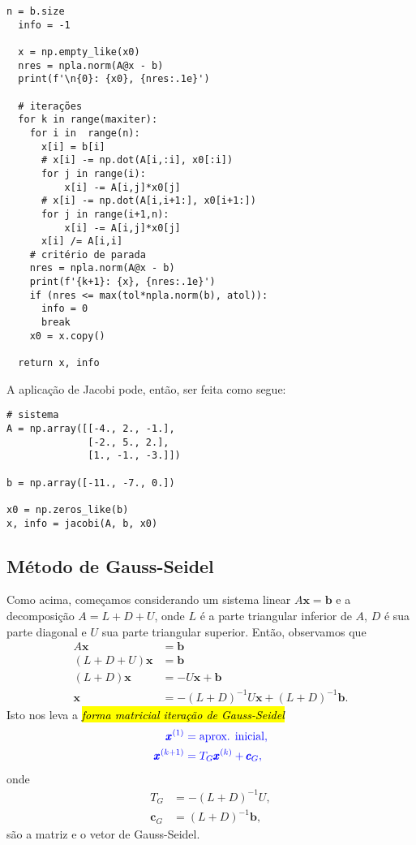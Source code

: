 \begin{ex}
\begin{lstlisting}[caption=jacobi.py, label=cap_sislin_sec_jgs:cod:jacobi]
  n = b.size
  info = -1

  x = np.empty_like(x0)
  nres = npla.norm(A@x - b)
  print(f'\n{0}: {x0}, {nres:.1e}')
  
  # iterações
  for k in range(maxiter):
    for i in  range(n):
      x[i] = b[i]
      # x[i] -= np.dot(A[i,:i], x0[:i])
      for j in range(i):
          x[i] -= A[i,j]*x0[j]
      # x[i] -= np.dot(A[i,i+1:], x0[i+1:])
      for j in range(i+1,n):
          x[i] -= A[i,j]*x0[j]
      x[i] /= A[i,i]
    # critério de parada
    nres = npla.norm(A@x - b)
    print(f'{k+1}: {x}, {nres:.1e}')
    if (nres <= max(tol*npla.norm(b), atol)):
      info = 0
      break
    x0 = x.copy()

  return x, info
\end{lstlisting}

A aplicação de Jacobi pode, então, ser feita como segue:

\begin{lstlisting}
# sistema
A = np.array([[-4., 2., -1.],
              [-2., 5., 2.],
              [1., -1., -3.]])

b = np.array([-11., -7., 0.])

x0 = np.zeros_like(b)
x, info = jacobi(A, b, x0)
\end{lstlisting}

\end{ex}

\subsection{Método de Gauss-Seidel}

Como acima, começamos considerando um sistema linear $A\pmb{x} = \pmb{b}$ e a decomposição $A = L + D + U$, onde $L$ é a parte triangular inferior de $A$, $D$ é sua parte diagonal e $U$ sua parte triangular superior. Então, observamos que
\begin{align}
  A\pmb{x} &= \pmb{b}\\
  (L + D + U)\pmb{x} &= \pmb{b}\\
  (L+D)\pmb{x} &= -U\pmb{x} + \pmb{b}\\
  \pmb{x} &= -(L+D)^{-1}U\pmb{x} + (L+D)^{-1}\pmb{b}.
\end{align}
Isto nos leva a \hl{\emph{forma matricial iteração de Gauss-Seidel}}
\begin{equation}\label{cap_sislin_sec_jgs:eq:iter_gs_mat}\color{blue}\begin{aligned}
    \pmb{x}^{(1)} &= \text{aprox. inicial},\\
    \pmb{x}^{(k+1)} &= T_G\pmb{x}^{(k)} + \pmb{c}_G,
  \end{aligned}
\end{equation}
onde
\begin{align}
  T_G &= -(L+D)^{-1}U,\\
  \pmb{c}_G &= (L+D)^{-1}\pmb{b},
\end{align}
são a matriz e o vetor de Gauss-Seidel.

